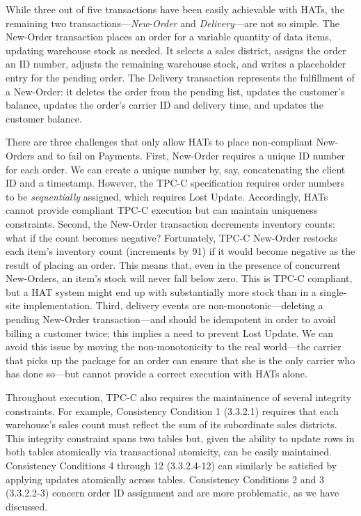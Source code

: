 While three out of five transactions have been easily achievable with
HATs, the remaining two transactions---\textit{New-Order} and
\textit{Delivery}---are not so simple. The New-Order transaction
places an order for a variable quantity of data items, updating
warehouse stock as needed. It selects a sales district, assigns the
order an ID number, adjusts the remaining warehouse stock, and writes
a placeholder entry for the pending order. The Delivery transaction
represents the fulfillment of a New-Order: it deletes the order from
the pending list, updates the customer's balance, updates the order's
carrier ID and delivery time, and updates the customer balance.

There are three challenges that only allow HATs to place non-compliant
New-Orders and to fail on Payments. First, New-Order requires a unique
ID number for each order. We can create a unique number by, say,
concatenating the client ID and a timestamp. However, the TPC-C
specification requires order numbers to be \textit{sequentially}
assigned, which requires Lost Update. Accordingly, HATs cannot provide
compliant TPC-C execution but can maintain uniqueness
constraints. Second, the New-Order transaction decrements inventory
counts: what if the count becomes negative? Fortunately, TPC-C
New-Order restocks each item's inventory count (increments by 91) if
it would become negative as the result of placing an order. This means
that, even in the presence of concurrent New-Orders, an item's stock
will never fall below zero. This is TPC-C compliant, but a HAT system
might end up with substantially more stock than in a single-site
implementation. Third, delivery events are non-monotonic---deleting a
pending New-Order transaction---and should be idempotent in order to
avoid billing a customer twice; this implies a need to prevent Lost
Update. We can avoid this issue by moving the non-monotonicity to the
real world---the carrier that picks up the package for an order can
ensure that she is the only carrier who has done so---but cannot
provide a correct execution with HATs alone.

Throughout execution, TPC-C also requires the maintainence of several
integrity constraints. For example, Consistency Condition 1 (3.3.2.1)
requires that each warehouse's sales count must reflect the sum of its
subordinate sales districts. This integrity constraint spans two
tables but, given the ability to update rows in both tables atomically
via transactional atomicity, can be easily maintained. Consistency
Conditions 4 through 12 (3.3.2.4-12) can similarly be satisfied by
applying updates atomically across tables. Consistency Conditions 2
and 3 (3.3.2.2-3) concern order ID assignment and are more
problematic, as we have discussed.

